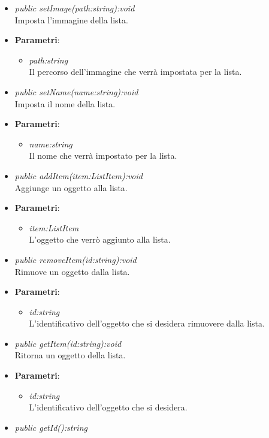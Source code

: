 \begin{itemize}
\begin{itemize}
	\item \textit{public setImage(path:string):void}\\
	Imposta l'immagine della lista.
				\item{\textbf{Parametri}: \begin{itemize}
				\item \textit{path:string}\\
				Il percorso dell'immagine che verrà impostata per la lista.
			\end{itemize}}
	\item \textit{public setName(name:string):void}\\
	Imposta il nome della lista.
				\item{\textbf{Parametri}: \begin{itemize}
				\item \textit{name:string}\\
				Il nome che verrà impostato per la lista.
			\end{itemize}}
	\item \textit{public addItem(item:ListItem):void}\\
	Aggiunge un oggetto alla lista.
				\item{\textbf{Parametri}: \begin{itemize}
				\item \textit{item:ListItem}\\
				L'oggetto che verrò aggiunto alla lista.
			\end{itemize}}
	\item \textit{public removeItem(id:string):void}\\
	Rimuove un oggetto dalla lista.
				\item{\textbf{Parametri}: \begin{itemize}
				\item \textit{id:string}\\
				L'identificativo dell'oggetto che si desidera rimuovere dalla lista.
			\end{itemize}}
	\item \textit{public getItem(id:string):void}\\
	Ritorna un oggetto della lista.
				\item{\textbf{Parametri}: \begin{itemize}
				\item \textit{id:string}\\
				L'identificativo dell'oggetto che si desidera.
			\end{itemize}}
	\item \textit{public getId():string}\\

\end{itemize}
\end{itemize}
